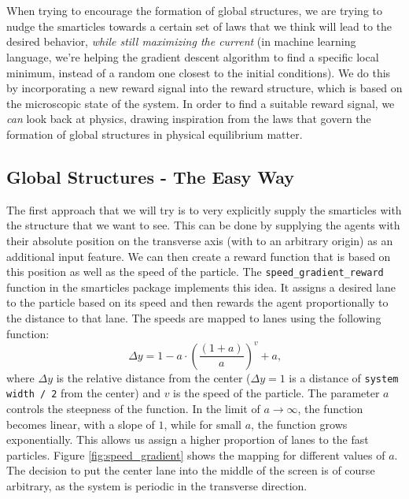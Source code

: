 \\
\\
When trying to encourage the formation of global structures, we are trying to nudge the smarticles towards a certain set of laws that we think will lead to the desired behavior, \textit{while still maximizing the current} (in machine learning language, we're helping the gradient descent algorithm to find a specific local minimum, instead of a random one closest to the initial conditions). We do this by incorporating a new reward signal into the reward structure, which is based on the microscopic state of the system. In order to find a suitable reward signal, we \textit{can} look back at physics, drawing inspiration from the laws that govern the formation of global structures in physical equilibrium matter.

\subsection{Global Structures - The Easy Way}
\label{sec:global_structure_easy}
The first approach that we will try is to very explicitly supply the smarticles with the structure that we want to see. This can be done by supplying the agents with their absolute position on the transverse axis (with to an arbitrary origin) as an additional input feature. We can then create a reward function that is based on this position as well as the speed of the particle. The \texttt{speed\_gradient\_reward} function in the smarticles package implements this idea. It assigns a desired lane to the particle based on its speed and then rewards the agent proportionally to the distance to that lane. The speeds are mapped to lanes using the following function:
\begin{equation}
    \Delta y=1-a\cdot\left(\frac{\left(1+a\right)}{a}\right)^{v}+a \text{,}
\end{equation}
where $\Delta y$ is the relative distance from the center ($\Delta y=1$ is a distance of \texttt{system width / 2} from the center) and $v$ is the speed of the particle. The parameter $a$ controls the steepness of the function. In the limit of $a\rightarrow\infty$, the function becomes linear, with a slope of $1$, while for small $a$, the function grows exponentially. This allows us assign a higher proportion of lanes to the fast particles. Figure \ref{fig:speed_gradient} shows the mapping for different values of $a$. The decision to put the center lane into the middle of the screen is of course arbitrary, as the system is periodic in the transverse direction. 
